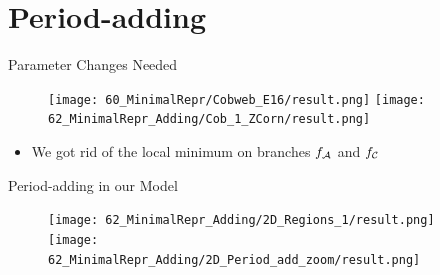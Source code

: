 \section{Period-adding}

\begin{frame}{Parameter Changes Needed}
	\vspace{-1em}
	\begin{figure}
		\texttt{[image: 60\_MinimalRepr/Cobweb\_E16/result.png]}
		\texttt{[image: 62\_MinimalRepr\_Adding/Cob\_1\_ZCorn/result.png]}
	\end{figure}
	\begin{itemize}
		\item We got rid of the local minimum on branches $f_{\mathcal{A}}$ and $f_{\mathcal{C}}$
	\end{itemize}
\end{frame}

\begin{frame}{Period-adding in our Model}
	\begin{figure}
		\texttt{[image: 62\_MinimalRepr\_Adding/2D\_Regions\_1/result.png]}
		\quad
		\texttt{[image: 62\_MinimalRepr\_Adding/2D\_Period\_add\_zoom/result.png]}
	\end{figure}
\end{frame}

